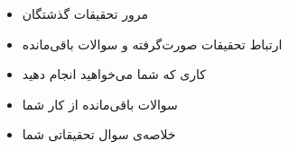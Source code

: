 
\label{lit_rev}
\begin{itemize}
\item
مرور تحقیقات گذشتگان
\item
ارتباط تحقیقات صورت‌گرفته و سوالات باقی‌مانده
\item
کاری که شما می‌خواهید انجام دهید
\item
سوالات باقی‌مانده از کار شما
\item
خلاصه‌ی سوال تحقیقاتی شما
\end{itemize}
